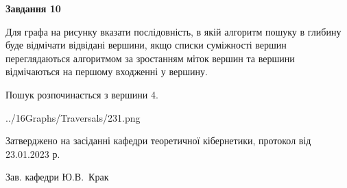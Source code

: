 \documentclass[12pt, ukrainian]{article}
\begin{document}
{\begin {large}
{\begin {center}\textbf{Завдання 10}\end {center}}\par
Для графа на рисунку вказати послідовність, в якій алгоритм пошуку в глибину буде відмічати відвідані вершини, якщо списки суміжності вершин переглядаються алгоритмом за зростанням міток вершин та вершини відмічаються на першому вход\-женні у вершину.\par
Пошук розпочинається з вершини 4.\par

\begin{center}
	{../16Graphs/Traversals/231.png}
\end{center}\par
\newpage


\end {large}
}
{\smallskip \begin {small} Затверджено на засіданні кафедри теоретичної кібернетики, протокол  від   23.01.2023 р.\par\smallskip\smallskip
{\parbox {6.5 cm}{Зав. кафедри \dotfill Ю.В.~Крак}} \end{small}}
\end{document}

